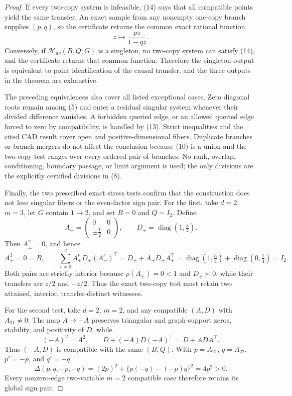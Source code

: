\documentclass{article}
\begin{document}
\begin{proof}
If every two-copy system is infeasible, (14) says that all compatible points yield the same transfer.  An exact sample from any nonempty one-copy branch supplies \((p,q)\), so the certificate returns the common exact rational function
\[
 z\longmapsto\frac{pz}{1-qz}.
\]
Conversely, if \(\mathcal H_{uv}(B,Q;G)\) is a singleton, no two-copy system can satisfy (14), and the certificate returns that common function.  Therefore the singleton output is equivalent to point identification of the causal transfer, and the three outputs in the theorem are exhaustive.

The preceding equivalences also cover all listed exceptional cases.  Zero diagonal roots remain among (5) and enter a residual singular system whenever their divided difference vanishes.  A forbidden queried edge, or an allowed queried edge forced to zero by compatibility, is handled by (13).  Strict inequalities and the cited CAD result cover open and positive-dimensional fibers.  Duplicate branches or branch mergers do not affect the conclusion because (10) is a union and the two-copy test ranges over every ordered pair of branches.  No rank, overlap, conditioning, boundary passage, or limit argument is used; the only divisions are the explicitly certified divisions in (8).

Finally, the two prescribed exact stress tests confirm that the construction does not lose singular fibers or the even-factor sign pair.  For the first, take \(d=2\), \(m=3\), let \(G\) contain \(1\to2\), and set \(B=0\) and \(Q=I_2\).  Define
\[
 A_{\pm}=\begin{pmatrix}0&0\\ \pm\tfrac12&0\end{pmatrix},
 \qquad
 D_{\pm}=\operatorname{diag}\!\left(1,\tfrac34\right).
\]
Then \(A_{\pm}^2=0\), and hence
\[
 A_{\pm}^3=0=B,
 \qquad
 \sum_{r=0}^{2}A_{\pm}^rD_{\pm}(A_{\pm}^r)^\top
 =D_{\pm}+A_{\pm}D_{\pm}A_{\pm}^\top
 =\operatorname{diag}\!\left(1,\tfrac34\right)
  +\operatorname{diag}\!\left(0,\tfrac14\right)
 =I_2.
\]
Both pairs are strictly interior because \(\rho(A_{\pm})=0<1\) and \(D_{\pm}\succ0\), while their transfers are \(z/2\) and \(-z/2\).  Thus the exact two-copy test must retain two attained, interior, transfer-distinct witnesses.

For the second test, take \(d=2\), \(m=2\), and any compatible \((A,D)\) with \(A_{21}\ne0\).  The map \(A\mapsto-A\) preserves triangular and graph-support zeros, stability, and positivity of \(D\), while
\[
 (-A)^2=A^2,
 \qquad
 D+(-A)D(-A)^\top=D+ADA^\top.
\]
Thus \((-A,D)\) is compatible with the same \((B,Q)\).  With \(p=A_{21}\), \(q=A_{22}\), \(p'=-p\), and \(q'=-q\),
\[
 \Delta(p,q,-p,-q)
 =(2p)^2+\{p(-q)-(-p)q\}^2
 =4p^2>0.
\]
Every nonzero-edge two-variable \(m=2\) compatible case therefore retains its global sign pair.
\end{proof}
\end{document}
